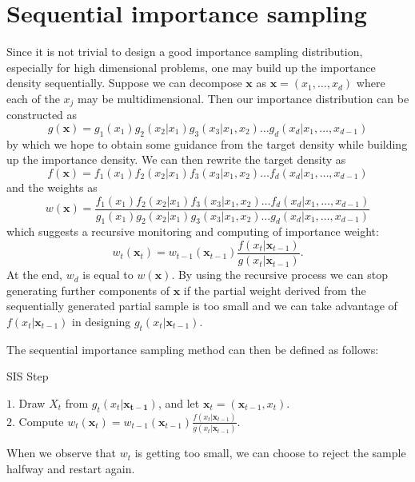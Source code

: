 \documentclass[times, utf8, diplomski]{fer}
\begin{document}
\section{Sequential importance sampling}
Since it is not trivial to design a good importance sampling distribution, especially for high dimensional problems, one may build up the importance density sequentially. Suppose we can decompose $\mathbf{x}$ as $\mathbf{x} = (x_1, \ldots, x_d)$ where each of the $x_j$ may be multidimensional. Then our importance distribution can be constructed as 
\begin{equation}
g(\mathbf{x}) = g_1(x_1) g_2(x_2 | x_1) g_3(x_3 | x_1, x_2) \ldots g_d(x_d | x_1, \ldots, x_{d - 1})
\end{equation}
by which we hope to obtain some guidance from the target density while building up the  importance density. We can then rewrite the target density as 
\begin{equation}
f(\mathbf{x}) = f_1(x_1) f_2(x_2 | x_1) f_3(x_3 | x_1, x_2) \ldots f_d(x_d | x_1, \ldots, x_{d - 1})
\end{equation}
and the weights as 
\begin{equation}
w(\mathbf{x}) = \frac{f_1(x_1) f_2(x_2 | x_1) f_3(x_3 | x_1, x_2) \ldots f_d(x_d | x_1, \ldots, x_{d - 1})}{g_1(x_1) g_2(x_2 | x_1) g_3(x_3 | x_1, x_2) \ldots g_d(x_d | x_1, \ldots, x_{d - 1})}
\end{equation}
which suggests a recursive monitoring and computing of importance weight:
\begin{equation}
w_t(\mathbf{x}_t) = w_{t - 1}(\mathbf{x}_{t - 1})\frac{f(x_t | \mathbf{x}_{t - 1})}{g(x_t | \mathbf{x}_{t - 1})}.    
\end{equation}
At the end, $w_d$ is equal to $w(\mathbf{x})$. By using the recursive process we can stop generating further components of $\mathbf{x}$ if the partial weight derived from the sequentially generated partial sample is too small and we can take advantage of $f(x_t | \mathbf{x}_{t - 1})$ in designing $g_t(x_t | \mathbf{x}_{t - 1})$.

The sequential importance sampling method can then be defined as follows:

\vspace{5mm}
\begin{algorithm}[H]
\caption{SIS Step}
$1.$ Draw $X_t$ from $g_t(x_t | \mathbf{x_{t-1}})$, and let $\mathbf{x}_t = (\mathbf{x}_{t - 1}, x_t)$.\\
$2.$ Compute $w_t(\mathbf{x}_t) = w_{t - 1}(\mathbf{x}_{t - 1})\frac{f(x_t | \mathbf{x}_{t - 1})}{g(x_t | \mathbf{x}_{t - 1})}$.\\
\label{SIS_step}
\end{algorithm}
\vspace{5mm}
When we observe that $w_t$ is getting too small, we can choose to reject the sample halfway and restart again.
\end{document}
